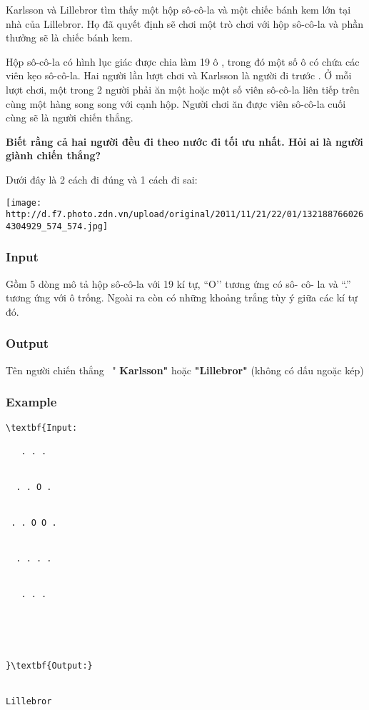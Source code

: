 



   Karlsson và Lillebror tìm thấy một hộp sô-cô-la và một chiếc bánh kem lớn tại nhà của Lillebror. Họ đã quyết định sẽ chơi một trò chơi với hộp sô-cô-la và phần thưởng sẽ là chiếc bánh kem.  

   Hộp sô-cô-la có hình lục giác được chia làm       19 ô      , trong đó một số ô có chứa các viên kẹo sô-cô-la. Hai người lần lượt chơi và       Karlsson là người đi trước      . Ở mỗi lượt chơi, một trong 2 người phải ăn một hoặc một số viên sô-cô-la liên tiếp trên cùng một hàng song song với cạnh hộp. Người chơi ăn được viên sô-cô-la cuối cùng sẽ là người chiến thắng.  

\textbf{    Biết rằng cả hai người đều đi theo nước đi tối ưu nhất. Hỏi ai là người giành chiến thắng?   }

   Dưới đây là 2 cách đi đúng và 1 cách đi sai:  


\texttt{[image: http://d.f7.photo.zdn.vn/upload/original/2011/11/21/22/01/1321887660264304929\_574\_574.jpg]}

\subsubsection{   Input  }

   Gồm 5 dòng mô tả hộp sô-cô-la với 19 kí tự, “O’’ tương ứng có sô- cô- la và “.” tương ứng với ô trống. Ngoài ra còn có những khoảng trắng tùy ý giữa các kí tự đó.  

\subsubsection{   Output  }

   Tên người chiến thắng  "   \textbf{    Karlsson"   }   hoặc   \textbf{    "Lillebror"   }   (không có dấu ngoặc kép)  

\subsubsection{   Example  }
\begin{verbatim}
\textbf{Input:

   . . .


  . . O .


 . . O O .


  . . . .


   . . .





}\textbf{Output:}


Lillebror\end{verbatim}

